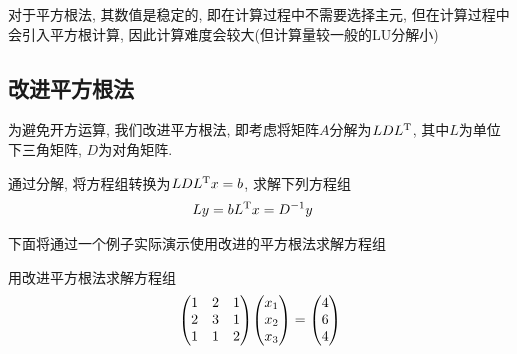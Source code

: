 对于平方根法, 其数值是稳定的, 即在计算过程中不需要选择主元, 但在计算过程中会引入平方根计算, 因此计算难度会较大(但计算量较一般的LU分解小)

\subsection{改进平方根法}

为避免开方运算, 我们改进平方根法, 即考虑将矩阵$A$分解为$LDL^\text{T}$, 其中$L$为单位下三角矩阵, $D$为对角矩阵.

通过分解, 将方程组转换为$LDL^\text{T}x=b$, 求解下列方程组
\begin{align*}
    Ly&=b
    L^\text{T}x=D^{-1}y
\end{align*}

下面将通过一个例子实际演示使用改进的平方根法求解方程组
\begin{example}
    用改进平方根法求解方程组
    \begin{equation*}
        \mqty(
            1&2&1\\
            2&3&1\\
            1&1&2
        )\mqty(x_1\\x_2\\x_3)=\mqty(4\\6\\4)
    \end{equation*}
\end{example}

